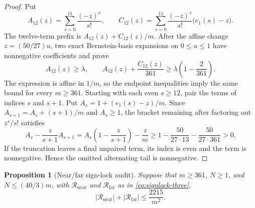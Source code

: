 \documentclass[11pt]{article}
\newtheorem{proposition}[theorem]{Proposition}
\theoremstyle{definition}
\theoremstyle{remark}
\begin{document}
\begin{proof}
Put
\[
 A_{12}(z)=\sum_{s=0}^{11}\frac{(-z)^s}{s!},
 \qquad
 C_{12}(z)=\sum_{s=0}^{11}\frac{(-z)^s}{s!}\bigl(e_1(s)-z\bigr).
\]
The twelve-term prefix is $A_{12}(z)+C_{12}(z)/m$.  After the affine change
$z=(50/27)u$, two exact Bernstein-basis expansions on $0\le u\le1$ have
nonnegative coefficients and prove
\[
 A_{12}(z)\ge\lambda,
 \qquad
 A_{12}(z)+\frac{C_{12}(z)}{361}
   \ge\lambda\left(1-\frac2{361}\right).
\]
The expression is affine in $1/m$, so the endpoint inequalities imply the same
bound for every $m\ge361$.  Starting with each even $s\ge12$, pair the terms
of indices $s$ and $s+1$.  Put $A_s=1+(e_1(s)-z)/m$.  Since
$A_{s+1}=A_s+(s+1)/m$ and $A_s\ge1$, the bracket remaining after factoring
out $z^s/s!$ satisfies
\[
 A_s-\frac{z}{s+1}A_{s+1}
 =A_s\left(1-\frac{z}{s+1}\right)-\frac zm
 \ge1-\frac{50}{27\cdot13}-\frac{50}{27\cdot361}>0.
\]
If the truncation leaves a final unpaired term, its index is even and the term
is nonnegative.  Hence the omitted alternating tail is nonnegative.
\end{proof}

\begin{proposition}[Near/far sign-lock audit]\label{prop:signlock-error-audit}
Suppose that $m\ge361$, $N\ge1$, and $N\le(40/3)m$, with
$\mathcal R_{\mathrm{near}}$ and $\mathcal R_{\mathrm{far}}$ as in
\eqref{eq:signlock-three},
\begin{equation}\label{eq:signlock-error-budget}
  |\mathcal R_{\mathrm{near}}|+|\mathcal R_{\mathrm{far}}|
  \le\frac{2215}{m^2}.
\end{equation}
\end{proposition}
\end{document}
